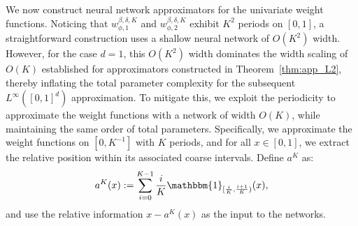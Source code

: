\documentclass[11pt]{article}
\begin{document}
We now construct neural network approximators for the univariate weight functions. Noticing that $w_{\phi,1}^{\beta, \delta, K}$ and $w_{\phi,2}^{\beta, \delta, K}$ exhibit $K^2$ periods on $[0,1]$, a straightforward construction uses a shallow neural network of $O(K^2)$ width. However, for the case $d=1$, this $O(K^2)$ width dominates the width scaling of $O(K)$  established for approximators constructed in Theorem~\ref{thm:app_L2},
thereby inflating the total parameter complexity for the subsequent $L^{\infty}([0,1]^d)$ approximation.
To mitigate this, we exploit the periodicity to approximate the weight functions with a network of width $O(K)$, while maintaining the same order of total parameters. Specifically, we approximate the weight functions on $[0, K^{-1}]$ with $K$ periods, and for all $x \in [0,1]$, we extract the relative position within its associated coarse intervals. Define $a^K$ as:
\begin{equation*}
    a^K(x): = \sum_{i=0}^{K-1} \frac{i}{K} \mathbbm{1}_{[\frac{i}{K},\frac{i+1}{K})} (x),
\end{equation*}
and use the relative information $x- a^K(x)$ as the input to the networks. 
\end{document}
